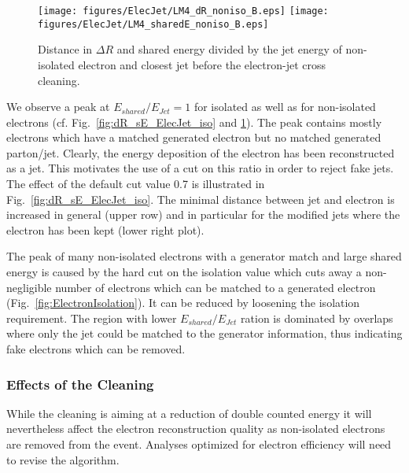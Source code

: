 \documentclass{cmspaper}
\begin{document}
\begin{figure}[htbp]
\begin{center}
    \texttt{[image: figures/ElecJet/LM4\_dR\_noniso\_B.eps]}
    \texttt{[image: figures/ElecJet/LM4\_sharedE\_noniso\_B.eps]}
    \caption{Distance in $\Delta R$ and shared energy divided by the jet energy
    of non-isolated electron and closest jet before the electron-jet cross cleaning.}
\label{fig:dR_sE_ElecJet_noniso}
\end{center}
\end{figure}

We observe a peak at $E_{shared}/E_{Jet}=1$ for isolated as well as for
non-isolated electrons (cf. Fig.~\ref{fig:dR_sE_ElecJet_iso} and
\ref{fig:dR_sE_ElecJet_noniso}). The peak contains mostly electrons which have a
matched generated electron but no matched generated parton/jet. Clearly, the
energy deposition of the electron has been reconstructed as a jet. This
motivates the use of a cut on this ratio in order to reject fake jets.  The
effect of the default cut value 0.7 is illustrated in Fig.~\ref{fig:dR_sE_ElecJet_iso}.
The minimal distance between jet and electron is increased in general (upper
row) and in particular for the modified jets where the electron has been kept
(lower right plot).

The peak of many non-isolated electrons with a generator match and large shared
energy is caused by the hard cut on the isolation value which cuts away a
non-negligible number of electrons which can be matched to a generated electron
(Fig.~\ref{fig:ElectronIsolation}). It can be reduced by loosening the
isolation requirement.
The region with lower $E_{shared}/E_{Jet}$ ration is dominated by overlaps
where only the jet could be matched to the generator information, thus
indicating fake electrons which can be removed.


\clearpage

\subsubsection{Effects of the Cleaning}
While the cleaning is aiming at a reduction of double counted energy it will
nevertheless affect the electron reconstruction quality as non-isolated
electrons are removed from the event. Analyses optimized for electron efficiency
will need to revise the algorithm.
\end{document}
